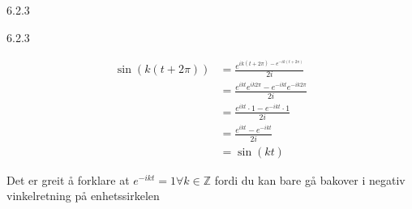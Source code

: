 \documentclass[a4paper,norsk]{article}
\begin{document}
\begin{oppgavebox}{6.2.3}{}
\begin{proofbox}{6.2.3}{}
\begin{itemize}
  
  \begin{align*}
    \sin(k \left(  t + 2 \pi  \right) ) &= \frac{ e^{ik \left( t + 2 \pi  \right) - e^{-ik \left( t + 2 \pi  \right) }  }  }{ 2i }\\
    &= \frac{ e^{ikt} e^{ik2 \pi } - e^{-ikt} e^{-ik 2 \pi } }{ 2i}\\
    &= \frac{ e^{ikt} \cdot 1 - e^{-ikt} \cdot 1 }{ 2i }\\
    &= \frac{ e^{ikt} - e^{-ikt}  }{ 2i }\\
    &= \sin(kt) 
  \end{align*}
\end{itemize}
Det er greit å forklare at $ e^{-ikt} = 1  \forall k \in \mathbb{Z}$ fordi du kan bare gå bakover i negativ vinkelretning på enhetssirkelen
\end{proofbox}
\end{oppgavebox}
\end{document}
